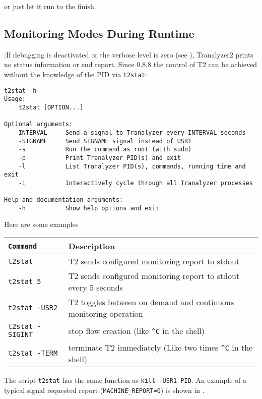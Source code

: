 or just let it run to the finish.

\subsection{Monitoring Modes During Runtime}
:If debugging is deactivated or the verbose level is zero (see ), Tranalyzer2 prints no status information or end report.
Since 0.8.8 the control of T2 can be achieved without the knowledge of the PID via {\tt t2stat}:

\begin{lstlisting}
t2stat -h
Usage:
    t2stat [OPTION...]

Optional arguments:
    INTERVAL     Send a signal to Tranalyzer every INTERVAL seconds
    -SIGNAME     Send SIGNAME signal instead of USR1
    -s           Run the command as root (with sudo)
    -p           Print Tranalyzer PID(s) and exit
    -l           List Tranalyzer PID(s), commands, running time and exit
    -i           Interactively cycle through all Tranalyzer processes

Help and documentation arguments:
    -h           Show help options and exit
\end{lstlisting}

Here are some examples

\begin{longtable}{>{\tt}ll}
    \toprule
    {\bf Command} & {\bf Description}\\
    \midrule\endhead%
    t2stat         & T2 sends configured monitoring report to stdout\\
    t2stat 5       & T2 sends configured monitoring report to stdout every 5 seconds\\
    t2stat -USR2   & T2 toggles between on demand and continuous monitoring operation \\
    t2stat -SIGINT & stop flow creation (like \verb!^C! in the shell) \\
    t2stat -TERM   & terminate T2 immediately (Like two times \verb!^C! in the shell) \\
    \bottomrule
\end{longtable}

The script {\tt t2stat} has the same function as {\tt kill -USR1 PID}.
An example of a typical signal requested report ({\tt MACHINE\_REPORT=0}) is shown in .

